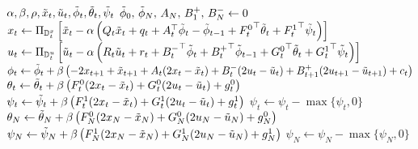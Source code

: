\documentclass[letterpaper,11pt]{article}
\newcommand{\xpipg}{\textsc{\relsize{-1}x\relsize{1}pipg}}
\begin{document}
\begin{algorithm}[!htpb]
    \caption{Customized \xpipg}
    \label{alg:xpipg-devec}
    \begin{algorithmic}[1]
        \Require $\alpha,\beta,\rho,\tilde{x}_t,\tilde{u}_t,\tilde{\phi}_t,\tilde{\theta}_t,\tilde{\psi}_t$
        \State $\tilde{\phi}_0,\,\tilde{\phi}_N,\,A_N,\,B^+_1,\,B^-_N \gets 0$
                \State $x_t \gets \Pi_{\mathbb{D}_t^x}\left[ \tilde{x}_t - \alpha \left( Q_t\tilde{x}_t + q_t + A_t^\top\tilde{\phi}_t - \tilde{\phi}_{t-1} + {F^0_t}^\top\tilde{\theta}_t + {F^1_t}^\top\tilde{\psi}_t \right)  \right]$
                \State $u_t \gets \Pi_{\mathbb{D}_t^u}\left[ \tilde{u}_t - \alpha \left( R_t\tilde{u}_t + r_t + {B^-_t}^\top\tilde{\phi}_t + {B^+_{t}}^\top\tilde{\phi}_{t-1} + {G^0_t}^\top\tilde{\theta}_t + {G^1_t}^\top \tilde{\psi}_t \right) \right]$
            \EndFor
                \State $\phi_t \gets \tilde{\phi}_t + \beta \left( -2x_{t+1}+\tilde{x}_{t+1} + A_t(2x_t-\tilde{x}_t)+B^-_t(2u_t-\tilde{u}_t)+B^+_{t+1}(2u_{t+1}-\tilde{u}_{t+1}) + c_t \right)$
                \State $\theta_t \gets \tilde{\theta}_t + \beta \left( F^0_t(2x_t-\tilde{x}_t) + G^0_t(2u_t-\tilde{u}_t) + g^0_t \right)$
                \State $\psi_t \gets \tilde{\psi}_t + \beta \left( F^1_t(2x_t-\tilde{x}_t) + G^1_t(2u_t-\tilde{u}_t) + g^1_t \right)$ 
                \State $\psi_t \gets \psi_t - \max\{\psi_t,0\}$               
            \EndFor
            \State $\theta_N \gets \tilde{\theta}_N + \beta \left( F^0_N(2x_N-\tilde{x}_N) + G^0_N(2u_N-\tilde{u}_N) + g^0_N \right)$
            \State $\psi_N \gets \tilde{\psi}_N + \beta \left( F^1_N(2x_N-\tilde{x}_N) + G^1_N(2u_N-\tilde{u}_N) + g^1_N \right)$ 
            \State $\psi_N \gets \psi_N - \max\{\psi_N,0\}$

\end{algorithmic}
\end{algorithm}
\end{document}
